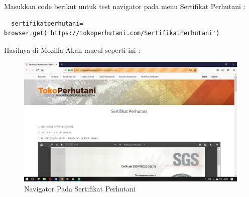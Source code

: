 Masukkan code berikut untuk test navigator pada menu Sertifikat Perhutani :

\begin{verbatim}
  sertifikatperhutani= browser.get('https://tokoperhutani.com/SertifikatPerhutani')
\end{verbatim}

Hasilnya  di Mozilla Akan mucul seperti ini :
\begin{figure}[h]
\centering
\includegraphics[scale=0.3]{figures/3}
\caption{Navigator Pada Sertifikat Perhutani}
\end{figure}
